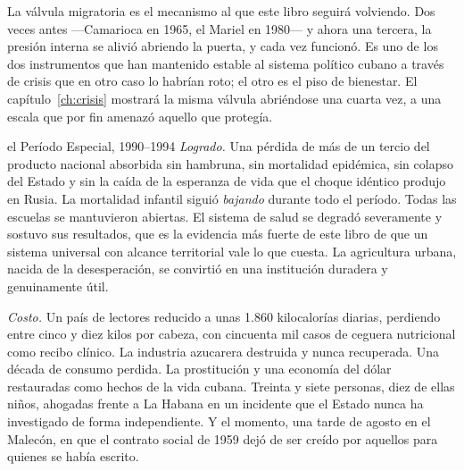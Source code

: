 La válvula migratoria es el mecanismo al que este libro seguirá volviendo. Dos
veces antes ---Camarioca en 1965, el Mariel en 1980--- y ahora una tercera, la
presión interna se alivió abriendo la puerta, y cada vez funcionó. Es uno de los
dos instrumentos que han mantenido estable al sistema político cubano a través de
crisis que en otro caso lo habrían roto; el otro es el piso de bienestar. El
capítulo~\ref{ch:crisis} mostrará la misma válvula abriéndose una cuarta vez, a
una escala que por fin amenazó aquello que protegía.

\begin{ledger}{el Período Especial, 1990--1994}
\emph{Logrado.} Una pérdida de más de un tercio del producto nacional absorbida
sin hambruna, sin mortalidad epidémica, sin colapso del Estado y sin la caída de
la esperanza de vida que el choque idéntico produjo en Rusia. La mortalidad
infantil siguió \emph{bajando} durante todo el período. Todas las escuelas se
mantuvieron abiertas. El sistema de salud se degradó severamente y sostuvo sus
resultados, que es la evidencia más fuerte de este libro de que un sistema
universal con alcance territorial vale lo que cuesta. La agricultura urbana,
nacida de la desesperación, se convirtió en una institución duradera y
genuinamente útil.

\emph{Costo.} Un país de lectores reducido a unas 1.860 kilocalorías diarias,
perdiendo entre cinco y diez kilos por cabeza, con cincuenta mil casos de ceguera
nutricional como recibo clínico. La industria azucarera destruida y nunca
recuperada. Una década de consumo perdida. La prostitución y una economía del
dólar restauradas como hechos de la vida cubana. Treinta y siete personas, diez de
ellas niños, ahogadas frente a La Habana en un incidente que el Estado nunca ha
investigado de forma independiente. Y el momento, una tarde de agosto en el
Malecón, en que el contrato social de 1959 dejó de ser creído por aquellos para
quienes se había escrito.
\end{ledger}
